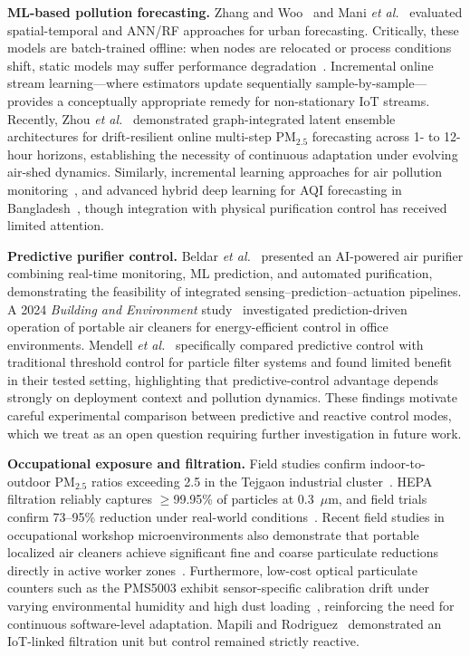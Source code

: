 \documentclass[12pt,a4paper]{article}
\newcommand{\etal}{\textit{et al.}}
\newcommand{\pmtf}{PM$_{2.5}$}
\begin{document}
\textbf{ML-based pollution forecasting.} Zhang and Woo~\citep{zhang2020realtime} and
Mani \etal{}~\citep{mani2021aipowered} evaluated spatial-temporal and ANN/RF approaches
for urban forecasting. Critically, these models are batch-trained offline: when nodes
are relocated or process conditions shift, static models may suffer performance
degradation~\citep{noman2025aiair}. Incremental online stream learning---where estimators
update sequentially sample-by-sample---provides a conceptually appropriate remedy for
non-stationary IoT streams. Recently, Zhou \etal{}~\citep{zhou2026drift} demonstrated graph-integrated latent ensemble architectures for drift-resilient online multi-step PM$_{2.5}$ forecasting across 1- to 12-hour horizons, establishing the necessity of continuous adaptation under evolving air-shed dynamics. Similarly, incremental learning approaches
for air pollution monitoring~\citep{incremental2024asc}, and advanced hybrid deep learning
for AQI forecasting in Bangladesh~\citep{bgldl2024ste}, though integration with
physical purification control has received limited attention.

\textbf{Predictive purifier control.} Beldar \etal{}~\citep{beldar2025aipurifier} presented
an AI-powered air purifier combining real-time monitoring, ML prediction, and automated
purification, demonstrating the feasibility of integrated sensing--prediction--actuation
pipelines. A 2024 \textit{Building and Environment} study~\citep{energyeff2024benv}
investigated prediction-driven operation of portable air cleaners for energy-efficient
control in office environments. Mendell \etal{}~\citep{mendell2025predictive} specifically
compared predictive control with traditional threshold control for particle filter systems
and found limited benefit in their tested setting, highlighting that predictive-control
advantage depends strongly on deployment context and pollution dynamics. These findings
motivate careful experimental comparison between predictive and reactive control modes,
which we treat as an open question requiring further investigation in future work.

\textbf{Occupational exposure and filtration.} Field studies confirm indoor-to-outdoor
\pmtf{} ratios exceeding 2.5 in the Tejgaon industrial cluster~\citep{basak2025spatial}.
HEPA filtration reliably captures $\geq$99.95\% of particles at 0.3~$\mu$m, and field
trials confirm 73--95\% reduction under real-world conditions~\citep{lu2023realworld,
cox2018effectiveness}. Recent field studies in occupational workshop microenvironments also demonstrate that portable localized air cleaners achieve significant fine and coarse particulate reductions directly in active worker zones~\citep{workshopcleaner2025}. Furthermore, low-cost optical particulate counters such as the PMS5003 exhibit sensor-specific calibration drift under varying environmental humidity and high dust loading~\citep{pms5003eval2025}, reinforcing the need for continuous software-level adaptation. Mapili and Rodriguez~\citep{mapili2021smart} demonstrated an
IoT-linked filtration unit but control remained strictly reactive.
\end{document}
